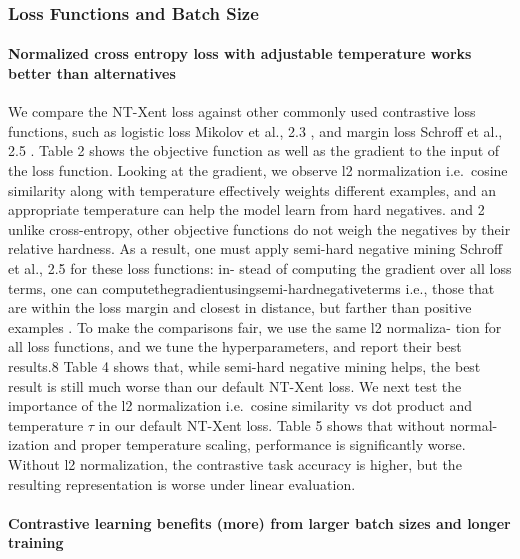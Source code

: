 \documentclass[
]{krantz}
\begin{document}
\hypertarget{loss-functions-and-batch-size}{%
\subsubsection{Loss Functions and Batch Size}\label{loss-functions-and-batch-size}}

\hypertarget{normalized-cross-entropy-loss-with-adjustable-temperature-works-better-than-alternatives}{%
\paragraph{Normalized cross entropy loss with adjustable temperature works better than alternatives}\label{normalized-cross-entropy-loss-with-adjustable-temperature-works-better-than-alternatives}}

We compare the NT-Xent loss against other commonly used contrastive loss functions, such as logistic loss Mikolov et al., 2.3 , and margin loss Schroff et al., 2.5 . Table 2 shows the objective function as well as the gradient to the input of the loss function. Looking at the gradient, we observe l2 normalization i.e.~cosine similarity along with temperature effectively weights different examples, and an appropriate temperature can help the model learn from hard negatives. and 2 unlike cross-entropy, other objective functions do not weigh the negatives by their relative hardness. As a result, one must apply semi-hard negative mining Schroff et al., 2.5 for these loss functions: in- stead of computing the gradient over all loss terms, one can computethegradientusingsemi-hardnegativeterms i.e., those that are within the loss margin and closest in distance, but farther than positive examples .
To make the comparisons fair, we use the same l2 normaliza- tion for all loss functions, and we tune the hyperparameters, and report their best results.8 Table 4 shows that, while semi-hard negative mining helps, the best result is still much worse than our default NT-Xent loss.
We next test the importance of the l2 normalization i.e.~cosine similarity vs dot product and temperature \(\tau\) in our default NT-Xent loss. Table 5 shows that without normal- ization and proper temperature scaling, performance is significantly worse. Without l2 normalization, the contrastive task accuracy is higher, but the resulting representation is worse under linear evaluation.

\hypertarget{contrastive-learning-benefits-more-from-larger-batch-sizes-and-longer-training}{%
\paragraph{Contrastive learning benefits (more) from larger batch sizes and longer training}\label{contrastive-learning-benefits-more-from-larger-batch-sizes-and-longer-training}}
\end{document}

